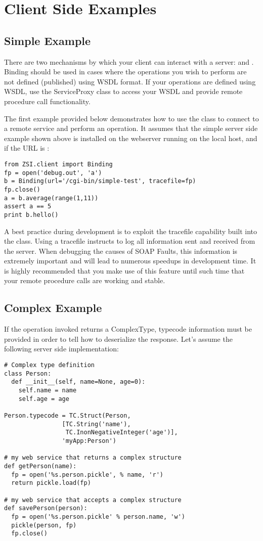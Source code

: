 \section{Client Side Examples}
\subsection{Simple Example}
There are two mechanisms by which your client can interact with a server:
 and .  Binding should be used in cases 
where the operations you wish to perform are not defined (published) using
WSDL format.  If your operations are defined using WSDL, use the ServiceProxy
class to access your WSDL and provide remote procedure call functionality.

The first example provided below demonstrates how to use the 
class to connect to a remote service and perform an operation.  It assumes
that the simple server side example shown above is installed on the webserver 
running on the local host, and if the URL is :

\begin{verbatim}
from ZSI.client import Binding
fp = open('debug.out', 'a')
b = Binding(url='/cgi-bin/simple-test', tracefile=fp)
fp.close()
a = b.average(range(1,11))
assert a == 5
print b.hello()
\end{verbatim}

A best practice during development is to exploit the tracefile capability built
into the  class.  Using a tracefile instructs  to
log all information sent and received from the server.  When debugging the
causes of SOAP Faults, this information is extremely important and will lead
to numerous speedups in development time.  It is highly recommended that you
make use of this feature until such time that your remote procedure calls are
working and stable.

\subsection{Complex Example}
If the operation invoked returns a ComplexType, typecode information must
be provided in order to tell \ZSI{} how to deserialize the response.  Let's
assume the following server side implementation:

\begin{verbatim}
# Complex type definition
class Person:
  def __init__(self, name=None, age=0):
    self.name = name
    self.age = age

Person.typecode = TC.Struct(Person,
			    [TC.String('name'),
			     TC.InonNegativeInteger('age')],
			    'myApp:Person')

# my web service that returns a complex structure
def getPerson(name):
  fp = open('%s.person.pickle', % name, 'r')
  return pickle.load(fp)

# my web service that accepts a complex structure
def savePerson(person):
  fp = open('%s.person.pickle' % person.name, 'w')
  pickle(person, fp)
  fp.close()
\end{verbatim}

